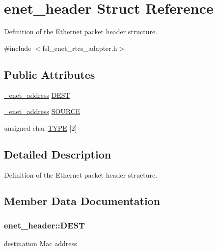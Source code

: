\hypertarget{structenet__header}{}\section{enet\+\_\+header Struct Reference}
\label{structenet__header}


Definition of the Ethernet packet header structure.  




{\ttfamily \#include $<$fsl\+\_\+enet\+\_\+rtcs\+\_\+adapter.\+h$>$}

\subsection*{Public Attributes}
\begin{DoxyCompactItemize}
\item 
\hyperlink{group__enet__rtcs__adaptor_ga82c41b61a1376f4a48ede6c89b9c4f2f}{\+\_\+enet\+\_\+address} \hyperlink{structenet__header_a63ceb32edf8236e5480d768289c3a576}{D\+E\+ST}
\item 
\hyperlink{group__enet__rtcs__adaptor_ga82c41b61a1376f4a48ede6c89b9c4f2f}{\+\_\+enet\+\_\+address} \hyperlink{structenet__header_a1ef78dcecb9c3865713859ddb4359bce}{S\+O\+U\+R\+CE}
\item 
unsigned char \hyperlink{structenet__header_aa83b6f6dc0c894bb88267e6a835c31eb}{T\+Y\+PE} \mbox{[}2\mbox{]}
\end{DoxyCompactItemize}


\subsection{Detailed Description}
Definition of the Ethernet packet header structure. 

\subsection{Member Data Documentation}
\subsubsection[{\texorpdfstring{D\+E\+ST}{DEST}}]{ enet\+\_\+header\+::\+D\+E\+ST}\hypertarget{structenet__header_a63ceb32edf8236e5480d768289c3a576}{}\label{structenet__header_a63ceb32edf8236e5480d768289c3a576}
destination Mac address 
